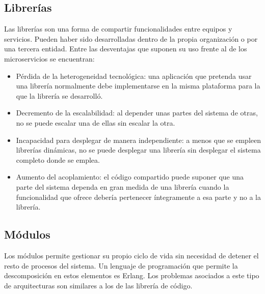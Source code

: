 \documentclass[11pt,a4paper]{article}
\begin{document}
\subsection{Librerías}
Las librerías son una forma de compartir funcionalidades entre equipos y servicios. Pueden haber sido desarrolladas dentro de la propia organización o por una tercera entidad. Entre las desventajas que suponen su uso frente al de los microservicios se encuentran:
\begin{itemize}
\item Pérdida de la heterogeneidad tecnológica: una aplicación que pretenda usar una librería normalmente debe implementarse en la misma plataforma para la que la librería se desarrolló.
\item Decremento de la escalabilidad: al depender unas partes del sistema de otras, no se puede escalar una de ellas sin escalar la otra.
\item Incapacidad para desplegar de manera independiente: a menos que se empleen librerías dinámicas, no se puede desplegar una librería sin desplegar el sistema completo donde se emplea.
\item Aumento del acoplamiento: el código compartido puede suponer que una parte del sistema dependa en gran medida de una librería cuando la funcionalidad que ofrece debería pertenecer íntegramente a esa parte y no a la librería.
\end{itemize}

\subsection{Módulos}
Los módulos permite gestionar su propio ciclo de vida sin necesidad de detener el resto de procesos del sistema. Un lenguaje de programación que permite la descomposición en estos elementos es Erlang. Los problemas asociados a este tipo de arquitecturas son similares a los de las librería de código.
\end{document}
